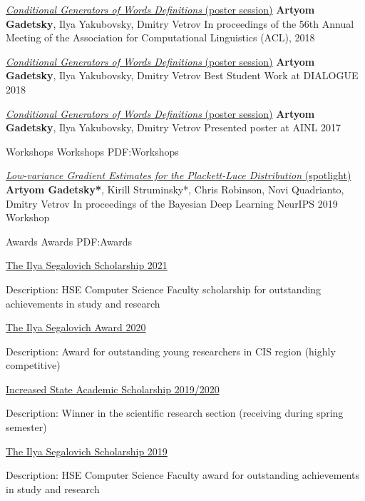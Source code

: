 \documentclass[letterpaper,MMMyyyy,nonstopmode]{simpleresumecv}
\begin{document}
\begin{Body}
\Gap
\Item
\href{https://aclanthology.org/P18-2043/}{\textit{Conditional Generators of Words Definitions} (poster session)}
\Item
\textbf{Artyom Gadetsky}, Ilya Yakubovsky, Dmitry Vetrov
\Item
In proceedings of the 56th Annual Meeting of the \newline
Association for Computational Linguistics (ACL), 2018

\Gap
\Item
\href{http://www.dialog-21.ru/en/}{\textit{Conditional Generators of Words Definitions} (poster session)}
\Item
\textbf{Artyom Gadetsky}, Ilya Yakubovsky, Dmitry Vetrov
\Item
Best Student Work at DIALOGUE 2018

\Gap
\Item
\href{http://ainlconf.ru/2017}{\textit{Conditional Generators of Words Definitions} (poster session)}
\Item
\textbf{Artyom Gadetsky}, Ilya Yakubovsky, Dmitry Vetrov
\Item
Presented poster at AINL 2017

\Gap
\SubSection
{Workshops}
{Workshops}
{PDF:Workshops}

\Item
\href{http://bayesiandeeplearning.org/2019/}{\textit{Low-variance Gradient Estimates for the Plackett-Luce Distribution} (spotlight)}
\Item
\textbf{Artyom Gadetsky*}, Kirill Struminsky*, Chris Robinson, Novi Quadrianto, Dmitry Vetrov
\Item
In proceedings of the Bayesian Deep Learning NeurIPS 2019 Workshop

\Section
{Awards}
{Awards}
{PDF:Awards}

\BulletItem
\href{https://cs.hse.ru/en/stipend/}{The Ilya Segalovich Scholarship 2021}
\begin{Detail}
\Item
Description: HSE Computer Science Faculty scholarship for outstanding achievements in study and research
\end{Detail}

\BulletItem
\href{https://yandex.ru/scholarships}{The Ilya Segalovich Award 2020}
\begin{Detail}
\Item
Description: Award for outstanding young researchers in CIS region (highly competitive)
\end{Detail}

\BulletItem
\href{https://www.hse.ru/en/scholarships/academic_raised_demo}{Increased State Academic Scholarship 2019/2020}
\begin{Detail}
\Item
Description: Winner in the scientific research section (receiving during spring semester)
\end{Detail}

\BulletItem
\href{https://cs.hse.ru/en/stipend/}{The Ilya Segalovich Scholarship 2019}
\begin{Detail}
\Item
Description: HSE Computer Science Faculty award for outstanding achievements in study and research
\end{Detail}


\end{Body}
\end{document}
